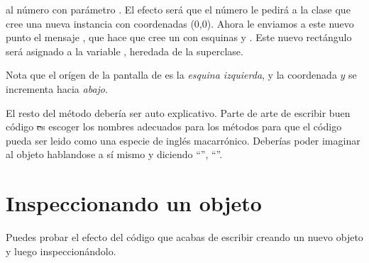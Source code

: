 \documentclass[a4paper,10pt,twoside]{book}
\begin{document}

al n\'umero  con par\'ametro .
El efecto ser\'a que el n\'umero  le pedir\'a a la clase  que cree una nueva instancia con coordenadas (0,0).
Ahora le enviamos a este nuevo punto el mensaje , que hace que cree un  con esquinas  y .
Este nuevo rect\'angulo ser\'a asignado a la variable , heredada de la superclase. 

Nota que el or\'igen de la pantalla de \pharo es la \emph{esquina izquierda}, y la coordenada $y$ se incrementa hacia \emph{abajo}.


El resto del m\'etodo deber\'ia ser auto explicativo. 
Parte de arte de escribir buen c\'odigo \st es escoger los nombres adecuados para los m\'etodos para que el c\'odigo pueda ser leido como una especie de ingl\'es macarr\'onico. 
Deber\'ias poder imaginar al objeto hablandose a s\'i mismo y diciendo ``'', ``''.

\section{Inspeccionando un objeto}

Puedes probar el efecto del c\'odigo que acabas de escribir creando un nuevo objeto  y luego inspeccion\'andolo. 
\end{document}
